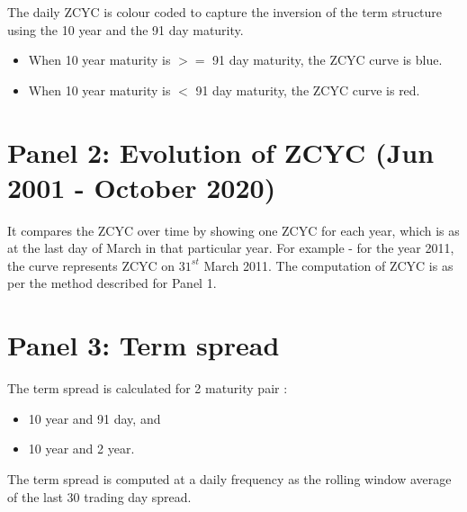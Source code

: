 \documentclass[12pt]{article}
\begin{document}
The daily ZCYC is colour coded to capture the inversion of the term structure using the 10 year and the 91 day maturity.
\begin{itemize}
\item When 10 year maturity is $>=$ 91 day maturity, the ZCYC curve is blue.
\item When 10 year maturity is $<$ 91 day maturity, the ZCYC curve is red.
\end{itemize}

\section*{Panel 2: Evolution of ZCYC (Jun 2001 - October 2020)}

It compares the ZCYC over time by showing one ZCYC for each year, which is as at the last day of March in that particular year. 
For example - for the year 2011, the curve represents ZCYC on $31^{st}$ March 2011. The computation of ZCYC is as per the method described for Panel 1.

\section*{Panel 3: Term spread}

The term spread is calculated for 2 maturity pair :
\begin{itemize}
\item 10 year and 91 day, and 
\item 10 year and 2 year. 
\end{itemize}
The term spread is computed at a daily frequency as the rolling window average of the last 30 trading day spread.
\end{document}

